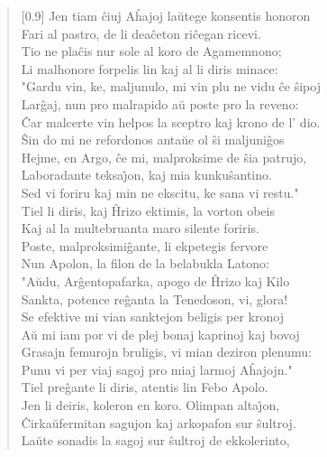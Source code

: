 \begin{verse}[0.9\textwidth]
           \vin  Jen tiam \^ciuj A\^hajoj la\u utege konsentis honoron\\
          Fari al pastro, de li dea\^ceton ri\^cegan ricevi.\\
          Tio ne pla\^cis nur sole al koro de Agamemnono;\\
          Li malhonore forpelis lin kaj al li diris minace:\\
          \vin"Gardu vin, ke, maljunulo, mi vin plu ne vidu \^ce \^sipoj\\
          Lar\^gaj, nun pro malrapido a\u u poste pro la reveno:\\
          \^Car malcerte vin helpos la sceptro kaj krono de l' dio.\\
          \^Sin do mi ne refordonos anta\u ue ol \^si maljuni\^gos\\
          Hejme, en Argo, \^ce mi, malproksime de \^sia patrujo,\\
          Laboradante teksa\^{\j}on, kaj mia kunku\^santino.\\
          Sed vi foriru kaj min ne ekscitu, ke sana vi restu."\\
          \vin   Tiel li diris, kaj \^Hrizo ektimis, la vorton obeis\\
          Kaj al la multebruanta maro silente foriris.\\
          Poste, malproksimi\^gante, li ekpetegis fervore\\
          Nun Apolon, la filon de la belabukla Latono:\\
           \vin  "A\u udu, Ar\^gentopafarka, apogo de \^Hrizo kaj Kilo\\
          Sankta, potence re\^ganta la Tenedoson, vi, glora!\\
          Se efektive mi vian sanktejon beligis per kronoj\\
          A\u u mi iam por vi de plej bonaj kaprinoj kaj bovoj\\
          Grasajn femurojn bruligis, vi mian deziron plenumu:\\
          Punu vi per viaj sagoj pro miaj larmoj A\^hajojn."\\
           \vin  Tiel pre\^gante li diris, atentis lin Febo Apolo.\\
          Jen li deiris, koleron en koro. Olimpan alta\^{\j}on,\\
          \^Cirka\u ufermitan sagujon kaj arkopafon sur \^sultroj.\\
          La\u ute sonadis la sagoj sur \^sultroj de ekkolerinto,\\

\end{verse}
